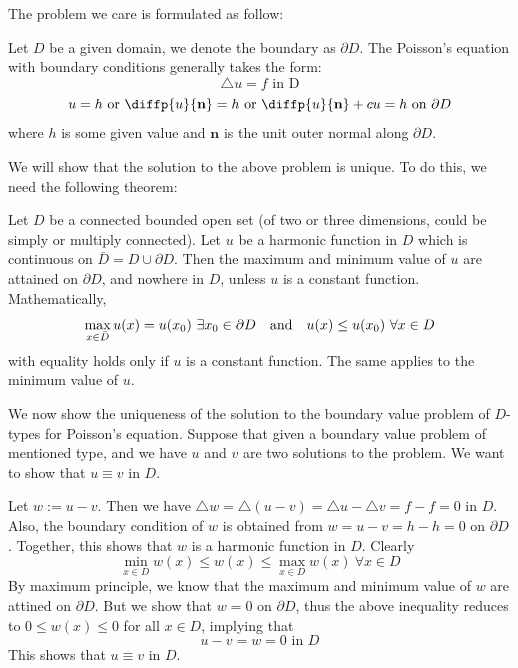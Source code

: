 The problem we care is formulated as follow:

\medskip 

\begin{defn} 
    Let $D$ be a given domain, we denote the boundary as $\partial D$. The Poisson's equation with boundary conditions generally takes the form:
    \[\triangle u = f \text{ in D}\]
    \[u = h \text{ or } \diffp{u}{{\mathbf n}} = h \text{ or } \diffp{u}{{\mathbf n}} + cu = h \text{ on } \partial D\]
    where $h$ is some given value and $\mathbf n$ is the unit outer normal along $\partial D$.
\end{defn}

We will show that the solution to the above problem is unique. To do this, we need the following theorem:

\medskip 

\begin{thm} 
    Let $D$ be a connected bounded open set (of two or three dimensions, could be simply or multiply connected). Let $u$ be a harmonic function in $D$ which is continuous on $\bar D = D \cup \partial D$. Then the maximum and minimum value of $u$ are attained on $\partial D$, and nowhere in $D$, unless $u$ is a constant function. Mathematically, 
    \[\max_{x\in \bar D} u(x) = u(x_0)\ \exists x_0\in \partial D \quad \text{and} \quad u(x) \leq u(x_0)\ \forall x\in D \]
    with equality holds only if $u$ is a constant function. The same applies to the minimum value of $u$.
\end{thm}

We now show the uniqueness of the solution to the boundary value problem of $D$-types for Poisson's equation. Suppose that given a boundary value problem of mentioned type, and we have $u$ and $v$ are two solutions to the problem. We want to show that $u\equiv v$ in $D$. 

Let $w := u-v$. Then we have $\triangle w = \triangle (u-v) = \triangle u - \triangle v = f-f = 0$ in $D$. Also, the boundary condition of $w$ is obtained from $w = u-v = h-h = 0$ on $\partial D$. Together, this shows that $w$ is a harmonic function in $D$. Clearly
\[\min_{x\in D}w(x) \leq w(x) \leq \max_{x\in D}w(x)\ \forall x\in D\]
By maximum principle, we know that the maximum and minimum value of $w$ are attined on $\partial D$. But we show that $w=0$ on $\partial D$, thus the above inequality reduces to $0\leq w(x) \leq 0$ for all $x\in D$, implying that 
\[u-v = w = 0 \text{ in } D\]
This shows that $u\equiv v$ in $D$.


